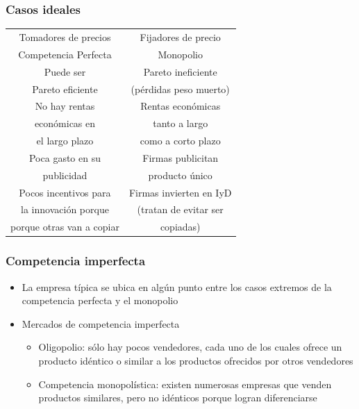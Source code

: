 \documentclass{beamer}
\begin{document}
\begin{frame}
\frametitle{Casos ideales}
\small
\begin{center}
    \begin{tabular}{c|c}
    \hline
    \hline
    Tomadores de precios & Fijadores de precio \\
    Competencia Perfecta & Monopolio
    \\
    \hline
    \hline
    Puede ser   & Pareto ineficiente \\ 
    Pareto eficiente & (pérdidas peso muerto)
    \\
    \hline
    No hay rentas & Rentas económicas \\
    económicas en & tanto a largo \\
    el largo plazo & como a corto plazo
    \\
    \hline
    Poca gasto en su & Firmas publicitan \\ publicidad & producto único 
    \\
    \hline
    Pocos incentivos para & Firmas invierten en IyD \\ 
    la innovación porque & (tratan de evitar ser \\
    porque otras van a copiar & copiadas)
\end{tabular}
\end{center}
\end{frame}

\begin{frame}
\frametitle{ Competencia imperfecta}
\begin{itemize}
    \item La empresa típica se ubica en algún punto entre los casos extremos de la competencia perfecta y el monopolio \vspace{2mm}
    \item Mercados de competencia imperfecta 
    \begin{itemize}
        \item Oligopolio: sólo hay pocos vendedores, cada uno de los cuales ofrece un producto idéntico o similar a los productos ofrecidos por otros vendedores
        \item Competencia monopolística: existen numerosas empresas que venden productos similares, pero no idénticos porque logran diferenciarse
    \end{itemize}
    \end{itemize}
\end{frame}
\end{document}
